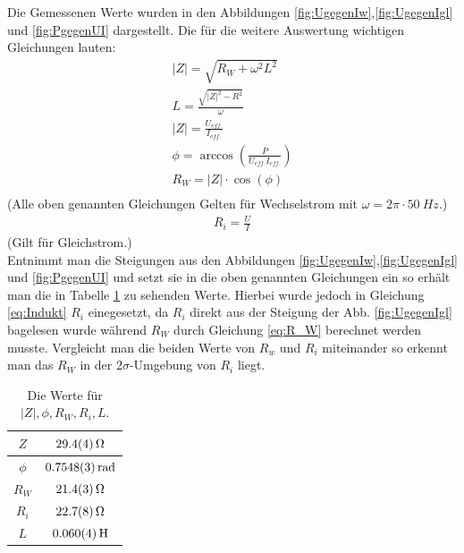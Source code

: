 Die Gemessenen Werte wurden in den Abbildungen \ref{fig:UgegenIw},\ref{fig:UgegenIgl} und \ref{fig:PgegenUI} dargestellt.
Die für die weitere Auswertung wichtigen Gleichungen lauten:
\begin{align}
	|Z|=\sqrt{R_W + \omega^2L^2}\\
	L=\frac{\sqrt{|Z|^2-R^2}}{\omega}\\
	\label{eq:Indukt}
	|Z|=\frac{U_{eff.}}{I_{eff.}}\\
	\phi = \arccos\left(\frac{\bar{P}}{U_{eff.}I_{eff.}}\right)\\
	R_W=|Z|\cdot \cos(\phi)\\	\label{eq:R_W}
\end{align}
(Alle oben genannten Gleichungen Gelten für Wechselstrom mit $\omega=2\pi \cdot \SI{50}{Hz}.$)
\begin{align}
	R_i=\frac{U}{I}
\end{align}
(Gilt für Gleichstrom.)\\
Entnimmt man die Steigungen aus den Abbildungen \ref{fig:UgegenIw},\ref{fig:UgegenIgl} und \ref{fig:PgegenUI} und setzt sie in die oben genannten Gleichungen ein so erhält man die in Tabelle \ref{tab:Spule} zu sehenden Werte. Hierbei wurde jedoch in Gleichung \ref{eq:Indukt} $R_i$ einegesetzt, da $R_i$ direkt aus der Steigung der Abb. \ref{fig:UgegenIgl} bagelesen wurde während $R_W$ durch Gleichung \ref{eq:R_W} berechnet werden musste. Vergleicht man die beiden Werte von $R_w$ und $R_i$ miteinander so erkennt man das  $R_W$ in der $2\sigma$-Umgebung von $R_i$ liegt. 

\begin{table}[h]
	\caption{Die Werte für $|Z|,\phi,R_W,R_i,L$.}
	\begin{tabular}{|c|c|}
		\hline
		$Z$ & $\SI{29.4+-0.4}{\ohm}$\\
		\hline
		$\phi$ & $\SI{0.7548+-0.0003}{rad}$\\
		\hline
		$R_W$ & $\SI{21.4+-0.3}{\ohm}$\\
		\hline
		$R_i$ & $\SI{22.7+-0.8}{\ohm}$\\
		\hline
		$L$ & $\SI{0,060+-0,004}{H}$\\
		\hline
	\end{tabular}
\label{tab:Spule}
\end{table}
